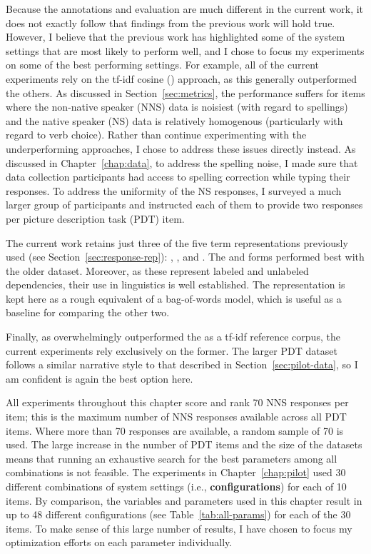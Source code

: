 Because the annotations and evaluation are much different in the current work, it does not exactly follow that findings from the previous work will hold true. However, I believe that the previous work has highlighted some of the system settings that are most likely to perform well, and I chose to focus my experiments on some of the best performing settings. For example, all of the current experiments rely on the tf-idf cosine () approach, as this generally outperformed the others. As discussed in Section~\ref{sec:metrics}, the  performance suffers for items where the non-native speaker (NNS) data is noisiest (with regard to spellings) and the native speaker (NS) data is relatively homogenous (particularly with regard to verb choice). Rather than continue experimenting with the underperforming approaches, I chose to address these issues directly instead. As discussed in Chapter~\ref{chap:data}, to address the spelling noise, I made sure that data collection participants had access to spelling correction while typing their responses. To address the uniformity of the NS responses, I surveyed a much larger group of participants and instructed each of them to provide two responses per picture description task (PDT) item.

The current work retains just three of the five term representations previously used (see Section~\ref{sec:response-rep}): , , and . The  and  forms performed best with the older dataset. Moreover, as these represent labeled and unlabeled dependencies, their use in linguistics is well established. The  representation is kept here as a rough equivalent of a bag-of-words model, which is useful as a baseline for comparing the other two.

Finally, as  overwhelmingly outperformed the  as a tf-idf reference corpus, the current experiments rely exclusively on the former. The larger PDT dataset follows a similar narrative style to that described in Section~\ref{sec:pilot-data}, so I am confident  is again the best option here.

All experiments throughout this chapter score and rank 70 NNS responses per item; this is the maximum number of NNS responses available across all PDT items. Where more than 70 responses are available, a random sample of 70 is used. The large increase in the number of PDT items and the size of the datasets means that running an exhaustive search for the best parameters among all combinations is not feasible. The experiments in Chapter~\ref{chap:pilot} used 30 different combinations of system settings (i.e., \textbf{configurations}) for each of 10 items. By comparison, the variables and parameters used in this chapter result in up to 48 different configurations (see Table~\ref{tab:all-params}) for each of the 30 items. To make sense of this large number of results, I have chosen to focus my optimization efforts on each parameter individually.


